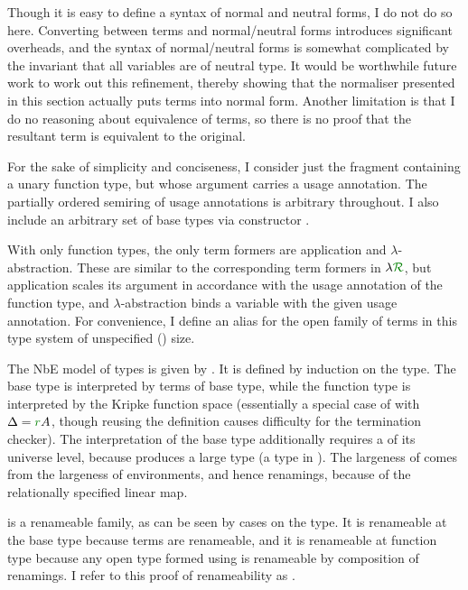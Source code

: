 Though it is easy to define a syntax of normal and neutral forms, I do not do so
here.
Converting between terms and normal/neutral forms introduces significant
overheads, and the syntax of normal/neutral forms is somewhat complicated by the
invariant that all variables are of neutral type.
It would be worthwhile future work to work out this refinement, thereby showing
that the normaliser presented in this section actually puts terms into normal
form.
Another limitation is that I do no reasoning about equivalence of terms, so
there is no proof that the resultant term is equivalent to the original.

For the sake of simplicity and conciseness, I consider just the fragment
containing a unary function type, but whose argument carries a usage annotation.
The partially ordered semiring of usage annotations is arbitrary throughout.
I also include an arbitrary set of base types  via constructor
\AgdaInductiveConstructor{$\iota$}.


With only function types, the only term formers are application and
$\lambda$-abstraction.
These are similar to the corresponding term formers in $\name$, but application
scales its argument in accordance with the usage annotation of the function
type, and $\lambda$-abstraction binds a variable with the given usage
annotation.
For convenience, I define an alias  for the open family of
terms in this type system of unspecified (\AgdaPostulate{$\infty$}) size.


The NbE model of types is given by \AgdaFunction{\_$\vDash$\_}.
It is defined by induction on the type.
The base type is interpreted by terms of base type, while
the function type is interpreted by the Kripke function space (essentially a
special case of  with $\Delta = \gr rA$, though reusing
the  definition causes difficulty for the termination
checker).
The interpretation of the base type additionally requires a 
of its universe level, because  produces a large type
(a type in ).
The largeness of  comes from the largeness of
environments, and hence renamings, because of the relationally specified linear
map.


\AgdaFunction{\_$\vDash$\_} is a renameable family, as can be seen by cases on
the type.
It is renameable at the base type because terms are renameable, and it is
renameable at function type because any open type formed using
 is renameable by composition of renamings.
I refer to this proof of renameability as
.

